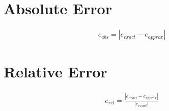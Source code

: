 \section{Absolute Error}

\begin{align}
	e_{abs} = | e_{exact} - e_{approx} |
	\label{eq:absoluteerror}
\end{align}

\section{Relative Error}

\begin{align}
	e_{rel} = \frac{| e_{exact} - e_{approx} |}{| e_{exact} |}
	\label{eq:relativepercentualerror}
\end{align}